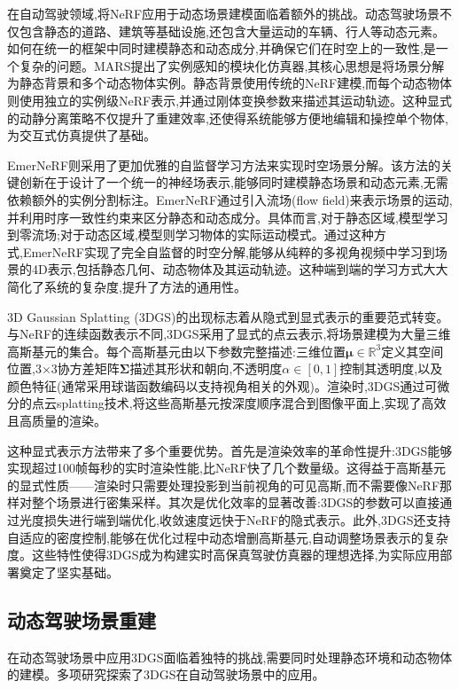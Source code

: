 在自动驾驶领域,将NeRF应用于动态场景建模面临着额外的挑战\cite{wu2023mars,yang2023emernerf}。动态驾驶场景不仅包含静态的道路、建筑等基础设施,还包含大量运动的车辆、行人等动态元素。如何在统一的框架中同时建模静态和动态成分,并确保它们在时空上的一致性,是一个复杂的问题。MARS\cite{wu2023mars}提出了实例感知的模块化仿真器,其核心思想是将场景分解为静态背景和多个动态物体实例。静态背景使用传统的NeRF建模,而每个动态物体则使用独立的实例级NeRF表示,并通过刚体变换参数来描述其运动轨迹。这种显式的动静分离策略不仅提升了重建效率,还使得系统能够方便地编辑和操控单个物体,为交互式仿真提供了基础。

EmerNeRF\cite{emernerf2023,yang2023emernerf}则采用了更加优雅的自监督学习方法来实现时空场景分解。该方法的关键创新在于设计了一个统一的神经场表示,能够同时建模静态场景和动态元素,无需依赖额外的实例分割标注。EmerNeRF通过引入流场(flow field)来表示场景的运动,并利用时序一致性约束来区分静态和动态成分。具体而言,对于静态区域,模型学习到零流场;对于动态区域,模型则学习物体的实际运动模式。通过这种方式,EmerNeRF实现了完全自监督的时空分解,能够从纯粹的多视角视频中学习到场景的4D表示,包括静态几何、动态物体及其运动轨迹。这种端到端的学习方式大大简化了系统的复杂度,提升了方法的通用性。

3D Gaussian Splatting (3DGS)的出现标志着从隐式到显式表示的重要范式转变\cite{kerbl2023gaussian,kerbl20233dgs}。与NeRF的连续函数表示不同,3DGS采用了显式的点云表示,将场景建模为大量三维高斯基元的集合。每个高斯基元由以下参数完整描述:三维位置$\boldsymbol{\mu} \in \mathbb{R}^3$定义其空间位置,3×3协方差矩阵$\boldsymbol{\Sigma}$描述其形状和朝向,不透明度$\alpha \in [0,1]$控制其透明度,以及颜色特征(通常采用球谐函数编码以支持视角相关的外观)。渲染时,3DGS通过可微分的点云splatting技术,将这些高斯基元按深度顺序混合到图像平面上,实现了高效且高质量的渲染。

这种显式表示方法带来了多个重要优势。首先是渲染效率的革命性提升:3DGS能够实现超过100帧每秒的实时渲染性能,比NeRF快了几个数量级。这得益于高斯基元的显式性质——渲染时只需要处理投影到当前视角的可见高斯,而不需要像NeRF那样对整个场景进行密集采样。其次是优化效率的显著改善:3DGS的参数可以直接通过光度损失进行端到端优化,收敛速度远快于NeRF的隐式表示。此外,3DGS还支持自适应的密度控制,能够在优化过程中动态增删高斯基元,自动调整场景表示的复杂度。这些特性使得3DGS成为构建实时高保真驾驶仿真器的理想选择,为实际应用部署奠定了坚实基础。

\subsection{动态驾驶场景重建}

在动态驾驶场景中应用3DGS面临着独特的挑战,需要同时处理静态环境和动态物体的建模。多项研究\cite{zhou2024drivinggaussian,yan2024street,yan2024streetgaussians,chen2023pvg,chen2023pvg_arxiv}探索了3DGS在自动驾驶场景中的应用。

